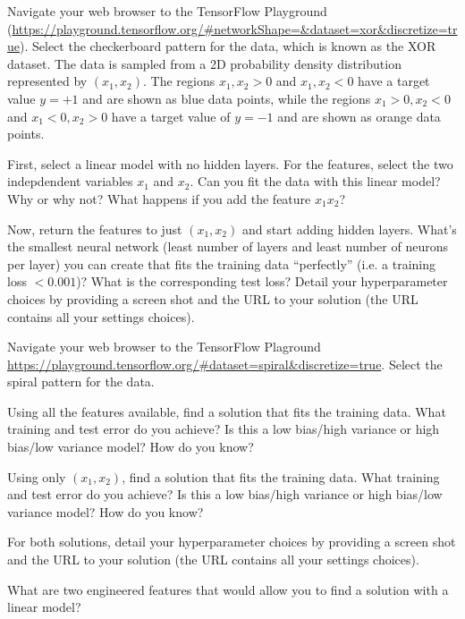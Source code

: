 \begin{problem}[6]
Navigate your web browser to the TensorFlow Playground (\url{https://playground.tensorflow.org/#networkShape=&dataset=xor&discretize=true}).
Select the checkerboard pattern for the data, which is known as the XOR dataset.
The data is sampled from a 2D probability density distribution represented by $(x_1, x_2)$.
The regions $x_1, x_2 > 0$ and $x_1, x_2 < 0$ have a target value $y = +1$ and are shown as blue data points, while the regions $x_1 > 0, x_2 < 0$ and $x_1 < 0, x_2 > 0$ have a target value of $y=-1$ and are shown as orange data points.

First, select a linear model with no hidden layers.
For the features, select the two indepdendent variables $x_1$ and $x_2$.
Can you fit the data with this linear model?
Why or why not?
What happens if you add the feature $x_1x_2$?

Now, return the features to just $(x_1, x_2)$ and start adding hidden layers.
What's the smallest neural network (least number of layers and least number of neurons per layer) you can create that fits the training data ``perfectly'' (i.e. a training loss ${<}0.001$)? What is the corresponding test loss?
Detail your hyperparameter choices by providing a screen shot and the URL to your solution (the URL contains all your settings choices).
\end{problem}

\begin{solution}

\end{solution}

\begin{problem}[8]
Navigate your web browser to the TensorFlow Plaground \url{https://playground.tensorflow.org/#dataset=spiral&discretize=true}.
Select the spiral pattern for the data.

Using all the features available, find a solution that fits the training data.
What training and test error do you achieve?
Is this a low bias/high variance or high bias/low variance model?
How do you know?

Using only $(x_1, x_2)$, find a solution that fits the training data.
What training and test error do you achieve?
Is this a low bias/high variance or high bias/low variance model?
How do you know?

For both solutions, detail your hyperparameter choices by providing a screen shot and the URL to your solution (the URL contains all your settings choices).

What are two engineered features that would allow you to find a solution with a linear model?
\end{problem}

\begin{solution}

\end{solution}


